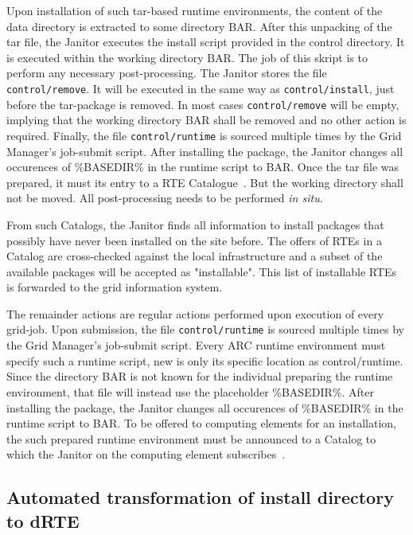 Upon installation of such tar-based runtime environments,
the content of the data directory is extracted to some directory
\textdollar BAR.  After this unpacking of the tar file, the Janitor
executes the install script provided in the control directory.  It is
executed within the working directory \textdollar BAR. The job of
this skript is to perform any necessary post-processing.
The Janitor stores the file \texttt{control/remove}. It will be executed
in the same way as \texttt{control/install}, just before the tar-package
is removed. In most cases \texttt{control/remove} will be empty, implying
that the working directory \textdollar BAR shall be removed and no other
action is required.
Finally, the file \texttt{control/runtime} is sourced multiple times
by the Grid Manager's job-submit script. After installing the package,
the Janitor changes all occurences of \%BASEDIR\% in the runtime script
to \textdollar BAR.  Once the tar file was prepared, it must its entry
to a RTE Catalogue~\cite[p. 10]{BAYER_2007}.
But the working directory shall not be moved. All post-processing needs
to be performed \textit{in situ}.

From such Catalogs, the Janitor finds all information to install
packages that possibly have never been installed on the site before. The
offers of RTEs in a Catalog are cross-checked against the local
infrastructure and a subset of the available packages will be accepted as
"installable". This list of installable RTEs is forwarded to the grid
information system.

The remainder actions are regular actions performed upon execution of every grid-job. Upon submission,
the file \texttt{control/runtime} is sourced multiple times by the Grid Manager's job-submit script. Every
ARC runtime environment must specify such a runtime script, new is only its specific location as control/runtime.
Since the directory \textdollar BAR is not known for the individual preparing the runtime environment, that
file will instead use the placeholder \%BASEDIR\%.  After installing the package, the Janitor changes all
occurences of \%BASEDIR\% in the runtime script to \textdollar BAR.  To be offered to computing elements
for an installation, the such prepared runtime environment must be announced to a Catalog to which the
Janitor on the computing element subscribes~\cite[p. 10]{BAYER_2007}.

\subsection{Automated transformation of install directory to dRTE}

